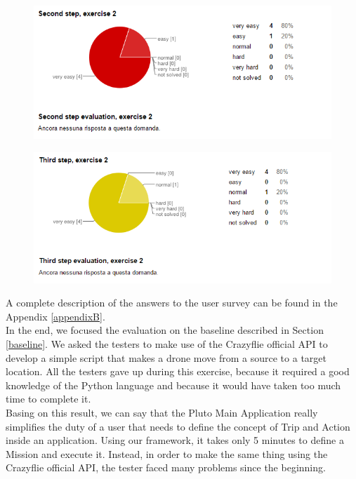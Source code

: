  \begin{figure}[H]
   \centering
   \includegraphics[width=\linewidth]{pictures/survey9.png}
   \label{fig:survey9}
 \end{figure}
 
\begin{figure}[H]
   \centering
   \includegraphics[width=\linewidth]{pictures/survey10.png}
   \label{fig:survey10}
 \end{figure}
 
A complete description of the answers to the user survey can be found in the Appendix \ref{appendixB}.
\\

In the end, we focused the evaluation on the baseline described in Section \ref{baseline}.
We asked the testers to make use of the Crazyflie official API to develop a simple script that makes a drone move from a source to a target location.
All the testers gave up during this exercise, because it required a good knowledge of the Python language and because it would have taken too much time to complete it.
\\
Basing on this result, we can say that the Pluto Main Application really simplifies the duty of a user that needs to define the concept of Trip and Action inside an application.
Using our framework, it takes only 5 minutes to define a Mission and execute it.
Instead, in order to make the same thing using the Crazyflie official API, the tester faced many problems since the beginning.
\\

